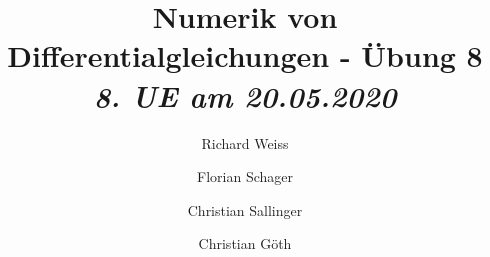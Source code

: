 \documentclass{article}
\title
{
  Numerik von Differentialgleichungen - Übung 8 \\
  \vspace{4pt}
  \normalsize
  \textit{8. UE am 20.05.2020}
}
\author
{
  Richard Weiss       \and
  Florian Schager     \and
  Christian Sallinger \and
  Christian Göth
}
\date{}
\begin{document}
\renewcommand{\figurename}{Abbildung}
\maketitle






\end{document}
